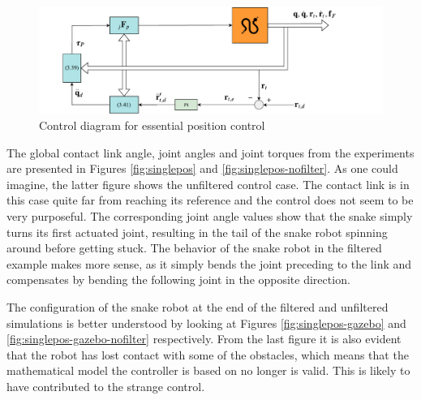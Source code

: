 \begin{figure}
    \centering
    \includegraphics[trim=1cm 0cm 3cm 0cm, clip=true, width=\textwidth]{figures/experiments/control-diagrams/p-control-diagram.pdf}
    \caption{Control diagram for essential position control}
    \label{fig:diag-p}
\end{figure}

The global contact link angle, joint angles and joint torques from the experiments are presented in Figures \ref{fig:singlepos} and \ref{fig:singlepos-nofilter}. As one could imagine, the latter figure shows the unfiltered control case. The contact link is in this case quite far from reaching its reference and the control does not seem to be very purposeful. The corresponding joint angle values show that the snake simply turns its first actuated joint, resulting in the tail of the snake robot spinning around before getting stuck. The behavior of the snake robot in the filtered example makes more sense, as it simply bends the joint preceding to the link and compensates by bending the following joint in the opposite direction.

The configuration of the snake robot at the end of the filtered and unfiltered simulations is better understood by looking at Figures \ref{fig:singlepos-gazebo} and \ref{fig:singlepos-gazebo-nofilter} respectively. From the last figure it is also evident that the robot has lost contact with some of the obstacles, which means that the mathematical model the controller is based on no longer is valid. This is likely to have contributed to the strange control.

